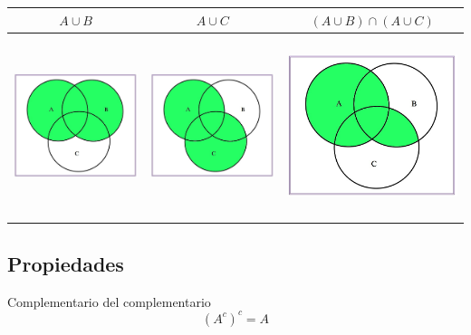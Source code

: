 \documentclass[]{book}
\begin{document}
\begin{longtable}[]{@{}ccc@{}}
\toprule
\(A\cup B\) & \(A\cup C\) & \((A\cup B)\cap (A\cup C)\)\tabularnewline
\midrule
\endhead
\includegraphics[width=\textwidth,height=2.08333in]{Images/proba1dibujos/distr21.jpg} & \includegraphics[width=\textwidth,height=2.08333in]{Images/proba1dibujos/distr22.jpg} & \includegraphics[width=\textwidth,height=2.08333in]{Images/proba1dibujos/distr23.jpg}\tabularnewline
\bottomrule
\end{longtable}

\hypertarget{propiedades-3}{%
\subsection{Propiedades}\label{propiedades-3}}

 Complementario del complementario
\[(A^c)^c=A\]
\end{document}
